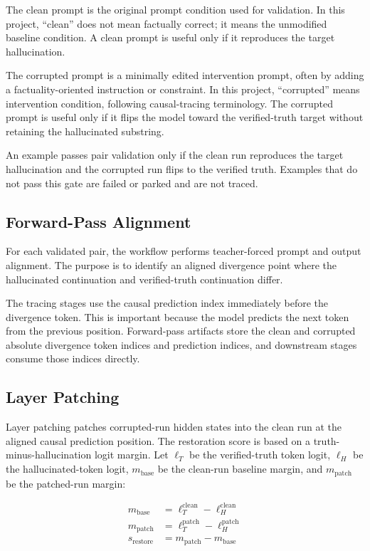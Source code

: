 \documentclass[11pt]{article}
\begin{document}
The clean prompt is the original prompt condition used for validation. In this project, ``clean'' does not mean factually correct; it means the unmodified baseline condition. A clean prompt is useful only if it reproduces the target hallucination.

The corrupted prompt is a minimally edited intervention prompt, often by adding a factuality-oriented instruction or constraint. In this project, ``corrupted'' means intervention condition, following causal-tracing terminology. The corrupted prompt is useful only if it flips the model toward the verified-truth target without retaining the hallucinated substring.

An example passes pair validation only if the clean run reproduces the target hallucination and the corrupted run flips to the verified truth. Examples that do not pass this gate are failed or parked and are not traced.

\subsection{Forward-Pass Alignment}

For each validated pair, the workflow performs teacher-forced prompt and output alignment. The purpose is to identify an aligned divergence point where the hallucinated continuation and verified-truth continuation differ.

The tracing stages use the causal prediction index immediately before the divergence token. This is important because the model predicts the next token from the previous position. Forward-pass artifacts store the clean and corrupted absolute divergence token indices and prediction indices, and downstream stages consume those indices directly.

\subsection{Layer Patching}

Layer patching patches corrupted-run hidden states into the clean run at the aligned causal prediction position. The restoration score is based on a truth-minus-hallucination logit margin. Let $\ell_T$ be the verified-truth token logit, $\ell_H$ be the hallucinated-token logit, $m_{\mathrm{base}}$ be the clean-run baseline margin, and $m_{\mathrm{patch}}$ be the patched-run margin:

\begin{align}
m_{\mathrm{base}} &= \ell_T^{\mathrm{clean}} - \ell_H^{\mathrm{clean}} \\
m_{\mathrm{patch}} &= \ell_T^{\mathrm{patch}} - \ell_H^{\mathrm{patch}} \\
s_{\mathrm{restore}} &= m_{\mathrm{patch}} - m_{\mathrm{base}}
\end{align}
\end{document}
